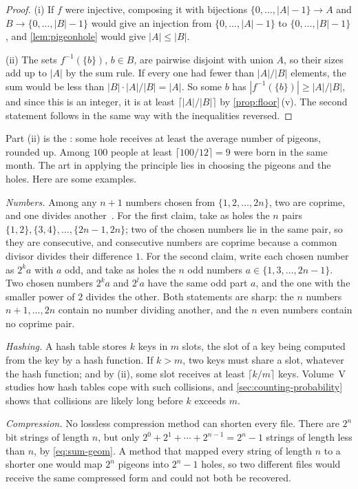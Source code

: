 \begin{proof}
(i) If $f$ were injective, composing it with bijections $\{0,\ldots,|A|-1\}\to A$ and $B\to\{0,\ldots,|B|-1\}$ would give an injection from $\{0,\ldots,|A|-1\}$ to $\{0,\ldots,|B|-1\}$, and \cref{lem:pigeonhole} would give $|A|\le|B|$.

(ii) The sets $f^{-1}(\{b\})$, $b\in B$, are pairwise disjoint with union $A$, so their sizes add up to $|A|$ by the sum rule. If every one had fewer than $|A|/|B|$ elements, the sum would be less than $|B|\cdot|A|/|B|=|A|$. So some $b$ has $|f^{-1}(\{b\})|\ge|A|/|B|$, and since this is an integer, it is at least $\lceil|A|/|B|\rceil$ by \cref{prop:floor}\,(v). The second statement follows in the same way with the inequalities reversed.
\end{proof}

Part (ii) is the : some hole receives at least the average number of pigeons, rounded up. Among $100$ people at least $\lceil100/12\rceil=9$ were born in the same month. The art in applying the principle lies in choosing the pigeons and the holes. Here are some examples.

\emph{Numbers.} Among any $n+1$ numbers chosen from $\{1,2,\ldots,2n\}$, two are coprime, and one divides another~\cite{aigner2018proofs}. For the first claim, take as holes the $n$ pairs $\{1,2\},\{3,4\},\ldots,\{2n-1,2n\}$; two of the chosen numbers lie in the same pair, so they are consecutive, and consecutive numbers are coprime because a common divisor divides their difference $1$. For the second claim, write each chosen number as $2^ka$ with $a$ odd, and take as holes the $n$ odd numbers $a\in\{1,3,\ldots,2n-1\}$. Two chosen numbers $2^ka$ and $2^la$ have the same odd part $a$, and the one with the smaller power of $2$ divides the other. Both statements are sharp: the $n$ numbers $n+1,\ldots,2n$ contain no number dividing another, and the $n$ even numbers contain no coprime pair.

\emph{Hashing.} A hash table stores $k$ keys in $m$ slots, the slot of a key being computed from the key by a hash function. If $k>m$, two keys must share a slot, whatever the hash function; and by (ii), some slot receives at least $\lceil k/m\rceil$ keys. Volume~V studies how hash tables cope with such collisions, and \cref{sec:counting-probability} shows that collisions are likely long before $k$ exceeds $m$.

\emph{Compression.} No lossless compression method can shorten every file. There are $2^n$ bit strings of length $n$, but only $2^0+2^1+\cdots+2^{n-1}=2^n-1$ strings of length less than $n$, by \eqref{eq:sum-geom}. A method that mapped every string of length $n$ to a shorter one would map $2^n$ pigeons into $2^n-1$ holes, so two different files would receive the same compressed form and could not both be recovered.

